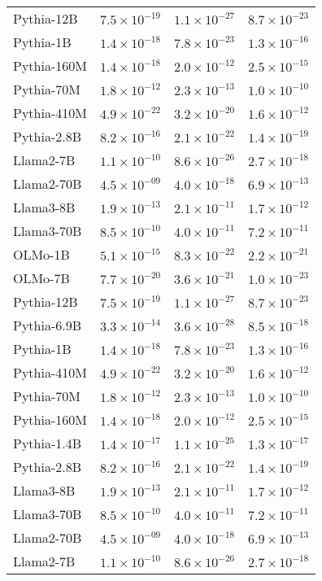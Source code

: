 \begin{table}[ht]
{\begin{tabular}{lccc}
 Pythia-12B & $7.5 \times 10^{-19}$ & $1.1 \times 10^{-27}$ & $8.7 \times 10^{-23}$ \\
  Pythia-1B & $1.4 \times 10^{-18}$ & $7.8 \times 10^{-23}$ & $1.3 \times 10^{-16}$ \\
Pythia-160M & $1.4 \times 10^{-18}$ & $2.0 \times 10^{-12}$ & $2.5 \times 10^{-15}$ \\
 Pythia-70M & $1.8 \times 10^{-12}$ & $2.3 \times 10^{-13}$ & $1.0 \times 10^{-10}$ \\
Pythia-410M & $4.9 \times 10^{-22}$ & $3.2 \times 10^{-20}$ & $1.6 \times 10^{-12}$ \\
Pythia-2.8B & $8.2 \times 10^{-16}$ & $2.1 \times 10^{-22}$ & $1.4 \times 10^{-19}$ \\
  Llama2-7B & $1.1 \times 10^{-10}$ & $8.6 \times 10^{-26}$ & $2.7 \times 10^{-18}$ \\
 Llama2-70B & $4.5 \times 10^{-09}$ & $4.0 \times 10^{-18}$ & $6.9 \times 10^{-13}$ \\
  Llama3-8B & $1.9 \times 10^{-13}$ & $2.1 \times 10^{-11}$ & $1.7 \times 10^{-12}$ \\
 Llama3-70B & $8.5 \times 10^{-10}$ & $4.0 \times 10^{-11}$ & $7.2 \times 10^{-11}$ \\
    OLMo-1B & $5.1 \times 10^{-15}$ & $8.3 \times 10^{-22}$ & $2.2 \times 10^{-21}$ \\
    OLMo-7B & $7.7 \times 10^{-20}$ & $3.6 \times 10^{-21}$ & $1.0 \times 10^{-23}$ \\
 Pythia-12B & $7.5 \times 10^{-19}$ & $1.1 \times 10^{-27}$ & $8.7 \times 10^{-23}$ \\
Pythia-6.9B & $3.3 \times 10^{-14}$ & $3.6 \times 10^{-28}$ & $8.5 \times 10^{-18}$ \\
  Pythia-1B & $1.4 \times 10^{-18}$ & $7.8 \times 10^{-23}$ & $1.3 \times 10^{-16}$ \\
Pythia-410M & $4.9 \times 10^{-22}$ & $3.2 \times 10^{-20}$ & $1.6 \times 10^{-12}$ \\
 Pythia-70M & $1.8 \times 10^{-12}$ & $2.3 \times 10^{-13}$ & $1.0 \times 10^{-10}$ \\
Pythia-160M & $1.4 \times 10^{-18}$ & $2.0 \times 10^{-12}$ & $2.5 \times 10^{-15}$ \\
Pythia-1.4B & $1.4 \times 10^{-17}$ & $1.1 \times 10^{-25}$ & $1.3 \times 10^{-17}$ \\
Pythia-2.8B & $8.2 \times 10^{-16}$ & $2.1 \times 10^{-22}$ & $1.4 \times 10^{-19}$ \\
  Llama3-8B & $1.9 \times 10^{-13}$ & $2.1 \times 10^{-11}$ & $1.7 \times 10^{-12}$ \\
 Llama3-70B & $8.5 \times 10^{-10}$ & $4.0 \times 10^{-11}$ & $7.2 \times 10^{-11}$ \\
 Llama2-70B & $4.5 \times 10^{-09}$ & $4.0 \times 10^{-18}$ & $6.9 \times 10^{-13}$ \\
  Llama2-7B & $1.1 \times 10^{-10}$ & $8.6 \times 10^{-26}$ & $2.7 \times 10^{-18}$ \\\bottomrule
\end{tabular}
}
\end{table}
